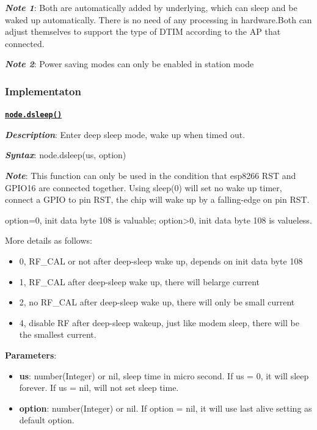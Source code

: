 \documentclass[16pt]{article}
\begin{document}
\vspace{0.2cm}

\textbf{\emph{Note 1}}: Both are automatically added by underlying, which
can sleep and be waked up automatically. There is no need of any
processing in hardware.Both can adjust themselves to support the type of
DTIM according to the AP that connected.

\vspace{0.1cm}

\textbf{\emph{Note 2}}: Power saving modes can only be enabled in station
mode

\vspace{0.6cm}

\subsubsection{Implementaton}

\vspace{0.3cm}

{\underline{\texttt{\textbf{node.dsleep()}}}}

\vspace{0.3cm}

\textbf{\emph{Description}}: Enter deep sleep mode, wake up when timed out.

\textbf{\emph{Syntax}}: node.dsleep(us, option)

\textbf{\emph{Note}}: This function can only be used in the condition that
esp8266 RST and GPIO16 are connected together. Using sleep(0) will set
no wake up timer, connect a GPIO to pin RST, the chip will wake up by a
falling-edge on pin RST.

option=0, init data byte 108 is valuable; option\textgreater{}0, init
data byte 108 is valueless.

More details as follows: 
\begin{itemize}
\item 0, RF\_CAL or not after deep-sleep wake up, depends on init data byte 108
\item 1, RF\_CAL after deep-sleep wake up, there will belarge current
\item 2, no RF\_CAL after deep-sleep wake up, there will only be small current 
\item 4, disable RF after deep-sleep wakeup, just like modem sleep, there will be the smallest current.
\end{itemize}

\textbf{Parameters}:

\begin{itemize}

\item
  \textbf{us}: number(Integer) or nil, sleep time in micro second. If us
  = 0, it will sleep forever. If us = nil, will not set sleep time.
\item
  \textbf{option}: number(Integer) or nil. If option = nil, it will use
  last alive setting as default option.
\end{itemize}
\end{document}
